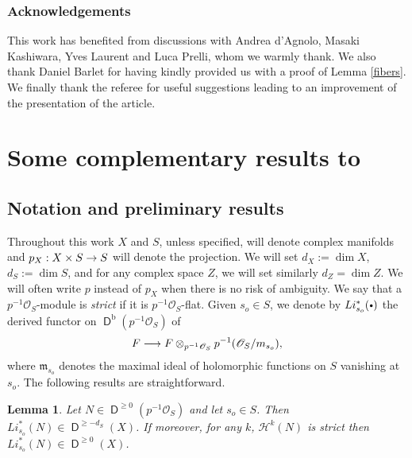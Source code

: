 \documentclass[english]{smfart}
\numberwithin{subsection}{section}
\def\shh{\mathcal{H}}
\def\shh{\mathcal{H}}
\def\sho{\mathcal{O}}\let\cO\sho
\newcommand{\rb}{\mathrm{b}}
\newcommand{\XS}{X\times S}
\DeclareMathOperator{\rD}{\mathsf{D}}
\let\geq\geqslant
\newcommand{\cbbullet}{{\raisebox{1pt}{$\sbullet$}}}
\newcommand{\sbullet}{{\scriptscriptstyle\bullet}}
\newcommand{\pOS}{p^{-1}\sho_S}
\numberwithin{equation}{section}
\theoremstyle{plain}
\newtheorem{lemma}[equation]{Lemma}
\theoremstyle{definition}
\def\to{\mathchoice{\longrightarrow}{\rightarrow}{\rightarrow}{\rightarrow}}
\begin{document}
\subsubsection*{Acknowledgements}
This work has benefited from discussions with Andrea d'Agnolo, Masaki Kashiwara, Yves Laurent and Luca Prelli, whom we warmly thank. We also thank Daniel Barlet for having kindly provided us with a proof of Lemma \ref{fibers}. We finally thank the referee for useful suggestions leading to an improvement of the presentation of the article.

\section{Some complementary results to \texorpdfstring{\cite{MF-S12}}{MFS12}}\label{S:1}

\subsection{Notation and preliminary results}
Throughout this work $X$ and $S$, unless specified, will denote complex manifolds and $p_X:\XS\to S$ will denote the projection. We will set $d_X:=\dim X$, $d_S:=\dim S$, and for any complex space $Z$, we will set similarly $d_Z=\dim Z$. We will often write $p$ instead of $p_X$ when there is no risk of ambiguity. We say that a $\pOS$-module is \emph{strict} if it is $\pOS$-flat. Given $s_o\in S$, we denote by $Li^*_{s_o} (\cbbullet)$ the derived functor on $\rD^\rb(\pOS)$ of
$$F\to F\otimes_{\pOS}p^{-1}(\sho_S/\mathfrak{m}_{s_o}),$$ where $\mathfrak{m}_{s_o}$ denotes the maximal ideal of holomorphic functions on $S$ vanishing at~$s_o$. The following results are straightforward.

\begin{lemma}\label{L:s}
Let $N\in\rD^{\geq0} (\pOS)$ and let $s_o\in S$. Then
$Li^*_{s_o}(N)\in \rD^{\geq-d_S}(X)$. If moreover, for any $k$, $\shh^k(N)$ is strict then
$Li^*_{s_o}(N)\in \rD^{\geq 0}(X)$.
\end{lemma}

\begin{comment}
\begin{proof}
For the first part of the statement it is sufficient to remark that $\sho/\mathfrak{m}_{s_o}$ admits locally a flat resolution of length equal to $d_S$.

For the second part, note that the assumption entails that
$\shh^k(Li^*_{s_o}N)=i^*_{s_o}\shh^k(N)$ for any $k$. Since
$\shh^kN=0$ for each $k<0$, we also have $\shh^k(Li^\ast_{s_o}N)=0$ for
each such~$k$.
\end{proof}
\end{comment}
\end{document}
